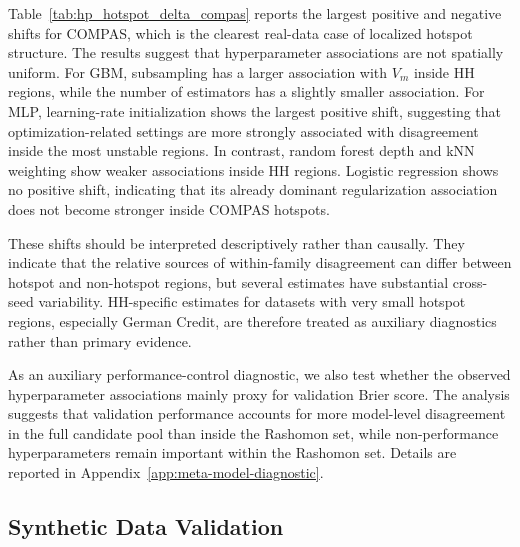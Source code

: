 Table~\ref{tab:hp_hotspot_delta_compas} reports the largest positive and negative shifts
for COMPAS, which is the clearest real-data case of localized hotspot structure. The
results suggest that hyperparameter associations are not spatially uniform. For GBM,
subsampling has a larger association with $V_m$ inside HH regions, while the number of
estimators has a slightly smaller association. For MLP, learning-rate initialization shows
the largest positive shift, suggesting that optimization-related settings are more strongly
associated with disagreement inside the most unstable regions. In contrast, random forest
depth and kNN weighting show weaker associations inside HH regions. Logistic regression
shows no positive shift, indicating that its already dominant regularization association
does not become stronger inside COMPAS hotspots.

These shifts should be interpreted descriptively rather than causally. They indicate that
the relative sources of within-family disagreement can differ between hotspot and
non-hotspot regions, but several estimates have substantial cross-seed variability.
HH-specific estimates for datasets with very small hotspot regions, especially German
Credit, are therefore treated as auxiliary diagnostics rather than primary evidence.

\begin{table}[htbp]
\centering
\caption{Largest positive and negative changes in within-family hyperparameter
importance inside COMPAS HH hotspots relative to all observations. Positive values
indicate greater $V_m$-based importance inside HH regions. The kNN negative shift is
based on six valid seeds because of group-support filtering.}
\label{tab:hp_hotspot_delta_compas}
\vspace{0.5em}

\end{table}

As an auxiliary performance-control diagnostic, we also test whether the observed
hyperparameter associations mainly proxy for validation Brier score. The analysis suggests
that validation performance accounts for more model-level disagreement in the full
candidate pool than inside the Rashomon set, while non-performance hyperparameters
remain important within the Rashomon set. Details are reported in
Appendix~\ref{app:meta-model-diagnostic}.

\subsection{Synthetic Data Validation}
\label{sec:results-synthetic}

